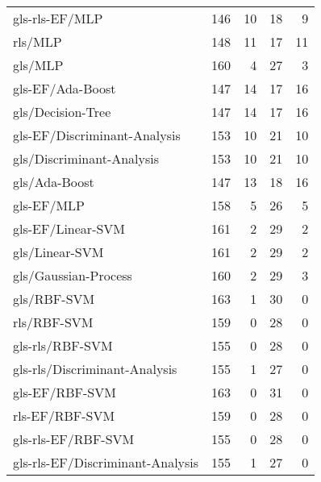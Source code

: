 \begin{longtable}{lrrrr}
    gls-rls-EF/MLP                   &  146 &  10 &  18 &   9 \\
    rls/MLP                          &  148 &  11 &  17 &  11 \\
    gls/MLP                          &  160 &   4 &  27 &   3 \\
    gls-EF/Ada-Boost                 &  147 &  14 &  17 &  16 \\
    gls/Decision-Tree                &  147 &  14 &  17 &  16 \\
    gls-EF/Discriminant-Analysis     &  153 &  10 &  21 &  10 \\
    gls/Discriminant-Analysis        &  153 &  10 &  21 &  10 \\
    gls/Ada-Boost                    &  147 &  13 &  18 &  16 \\
    gls-EF/MLP                       &  158 &   5 &  26 &   5 \\
    gls-EF/Linear-SVM                &  161 &   2 &  29 &   2 \\
    gls/Linear-SVM                   &  161 &   2 &  29 &   2 \\
    gls/Gaussian-Process             &  160 &   2 &  29 &   3 \\
    gls/RBF-SVM                      &  163 &   1 &  30 &   0 \\
    rls/RBF-SVM                      &  159 &   0 &  28 &   0 \\
    gls-rls/RBF-SVM                  &  155 &   0 &  28 &   0 \\
    gls-rls/Discriminant-Analysis    &  155 &   1 &  27 &   0 \\
    gls-EF/RBF-SVM                   &  163 &   0 &  31 &   0 \\
    rls-EF/RBF-SVM                   &  159 &   0 &  28 &   0 \\
    gls-rls-EF/RBF-SVM               &  155 &   0 &  28 &   0 \\
    gls-rls-EF/Discriminant-Analysis &  155 &   1 &  27 &   0 \\
    \hline
\end{longtable}

